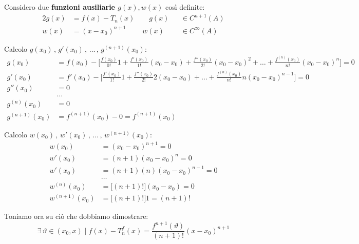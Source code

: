 \documentclass[../../dimostrazioni]{subfiles}
\begin{document}
            \medskip

            Considero due \textbf{funzioni ausiliarie \(g(x), w(x)\)} così definite:
            \begin{alignat*}{2}
                g(x) &= f(x) - T_n (x) \qquad g(x) &&\in C^{n+1} (A)\\
                w(x) &= (x - x_0)^{n+1} \qquad \; w(x) &&\in C^{\infty} (A)
            \end{alignat*}

            \newpage

            Calcolo \( g(x_0)\, , \, g'(x_0)\, ,\, \dots\, , \, g ^{(n+1)}(x_0)  \):
            \begin{align*}
                g(x_0) &= f(x_0) - \bigg[\frac{f(x_0)}{0!}1 + \frac{f'(x_0)}{1!}(x_0-x_0) + \frac{f''(x_0)}{2!}(x_0-x_0)^2 + \dots + \frac{f^{(n)}(x_0)}{n!}(x_0-x_0)^n \bigg] = 0\\
                g'(x_0) &= f'(x_0) - \bigg[\frac{f'(x_0)}{1!}1 + \frac{f''(x_0)}{2!}2(x_0-x_0) + \dots + \frac{f^{(n)}(x_0)}{n!}n(x_0-x_0)^{n-1} \bigg] = 0\\
                g''(x_0) &= 0\\
                &\dots\\
                g^{(n)} (x_0) &= 0\\
                g^{(n+1)} (x_0) &= f^{(n+1)}(x_0) - 0 = f^{(n+1)}(x_0)
            \end{align*}

            \bigskip
            
            Calcolo \( w(x_0)\, , \, w'(x_0)\, ,\, \dots\, , \, w ^{(n+1)}(x_0)  \):
            \begin{align*}
                w(x_0) &= (x_0 - x_0)^{n+1} = 0\\
                w'(x_0) &= (n+1)(x_0 - x_0)^{n} = 0\\
                w'(x_0) &= (n+1)(n)(x_0 - x_0)^{n-1} = 0\\
                & \dots\\
                w^{(n)} (x_0) &= \big[(n+1)!\big](x_0 - x_0) = 0\\
                w^{(n+1)} (x_0) &= \big[(n+1)!\big] 1 = (n+1)!
            \end{align*}

            \bigskip

            Toniamo ora su ciò che dobbiamo dimostrare:
            \[  \exists \, \vartheta \in (x_0, x) \; | \; f(x) - T _n ^ f (x) = \frac{f^{n+1}(\vartheta)}{(n+1)!}(x-x_0)^{n+1} \]
\end{document}
